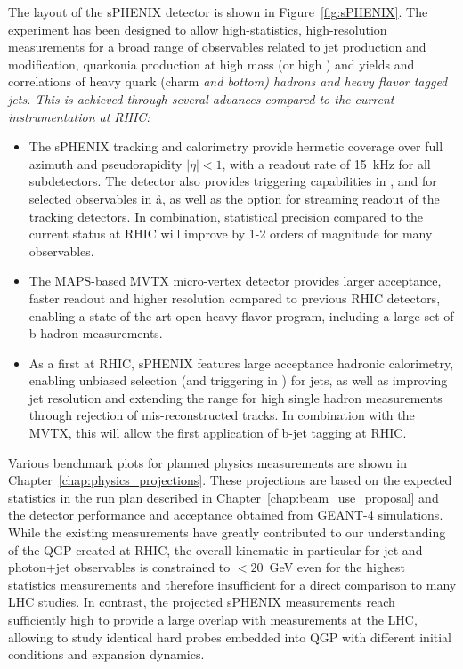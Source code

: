 The layout of the sPHENIX detector is shown in Figure~\ref{fig:sPHENIX}. The experiment has been designed to allow high-statistics, high-resolution measurements for a broad
range of observables related to jet production and modification, quarkonia production
at high mass (or high \pt) and yields and correlations of heavy quark (charm \em and \em bottom) hadrons and heavy flavor tagged jets.
This is achieved through several advances compared to the current instrumentation at RHIC:
\begin{itemize}
    \item The sPHENIX tracking and calorimetry provide hermetic coverage over full azimuth and pseudorapidity $|\eta| < 1$, with a readout rate of 15~kHz for all subdetectors. The detector also provides triggering capabilities in \pp, and for selected observables in \aa, as well as the option for streaming readout of the tracking detectors. In combination, statistical precision compared to the current status at RHIC will improve  by 1-2 orders of magnitude for many observables.
    \item The MAPS-based MVTX micro-vertex detector provides larger acceptance, faster readout and higher resolution compared to previous RHIC detectors, enabling a state-of-the-art open heavy flavor program, including a large set of b-hadron measurements. 
    \item As a first at RHIC, sPHENIX features large acceptance hadronic calorimetry, enabling unbiased selection (and triggering in \pp) for jets, as well as improving jet resolution and extending the range for high \pt single hadron measurements through rejection of mis-reconstructed tracks. In combination with the MVTX, this will allow the first application of b-jet tagging at RHIC. 
\end{itemize}
Various benchmark plots for planned physics
measurements are shown in Chapter~\ref{chap:physics_projections}. These projections are based on the expected statistics in the run plan described in Chapter~\ref{chap:beam_use_proposal} and the detector performance and acceptance obtained from {\textsc{GEANT-4}} simulations. While the existing measurements have greatly contributed to our understanding of the QGP created at RHIC, the overall kinematic in particular for jet and photon+jet observables is constrained to $< 20$~GeV even for the highest statistics measurements and therefore insufficient for a direct comparison to many LHC studies. In contrast, the projected sPHENIX measurements reach sufficiently high \pt to provide a large overlap with  measurements at the LHC, allowing to study identical hard probes embedded into QGP with different initial conditions and expansion dynamics.


